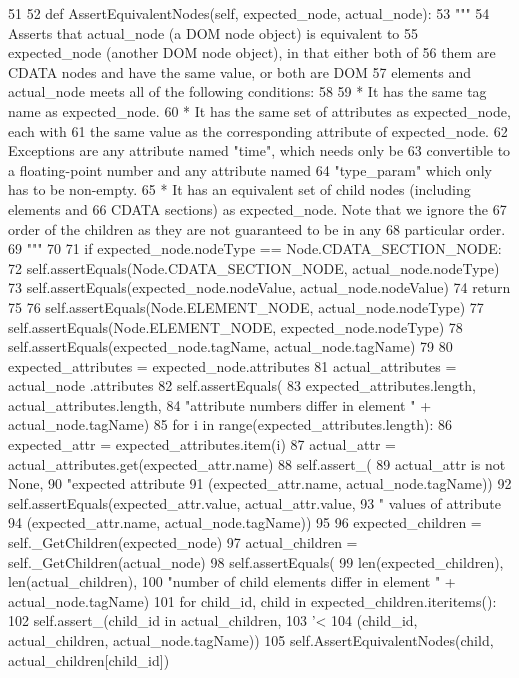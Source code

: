 \begin{DoxyCode}
51 
52   def AssertEquivalentNodes(self, expected_node, actual_node):
53     """
54     Asserts that actual_node (a DOM node object) is equivalent to
55     expected_node (another DOM node object), in that either both of
56     them are CDATA nodes and have the same value, or both are DOM
57     elements and actual_node meets all of the following conditions:
58 
59     *  It has the same tag name as expected_node.
60     *  It has the same set of attributes as expected_node, each with
61        the same value as the corresponding attribute of expected_node.
62        Exceptions are any attribute named "time", which needs only be
63        convertible to a floating-point number and any attribute named
64        "type_param" which only has to be non-empty.
65     *  It has an equivalent set of child nodes (including elements and
66        CDATA sections) as expected_node.  Note that we ignore the
67        order of the children as they are not guaranteed to be in any
68        particular order.
69     """
70 
71     if expected_node.nodeType == Node.CDATA_SECTION_NODE:
72       self.assertEquals(Node.CDATA_SECTION_NODE, actual_node.nodeType)
73       self.assertEquals(expected_node.nodeValue, actual_node.nodeValue)
74       return
75 
76     self.assertEquals(Node.ELEMENT_NODE, actual_node.nodeType)
77     self.assertEquals(Node.ELEMENT_NODE, expected_node.nodeType)
78     self.assertEquals(expected_node.tagName, actual_node.tagName)
79 
80     expected_attributes = expected_node.attributes
81     actual_attributes   = actual_node  .attributes
82     self.assertEquals(
83         expected_attributes.length, actual_attributes.length,
84         "attribute numbers differ in element " + actual_node.tagName)
85     for i in range(expected_attributes.length):
86       expected_attr = expected_attributes.item(i)
87       actual_attr   = actual_attributes.get(expected_attr.name)
88       self.assert_(
89           actual_attr is not None,
90           "expected attribute %
91           (expected_attr.name, actual_node.tagName))
92       self.assertEquals(expected_attr.value, actual_attr.value,
93                         " values of attribute %
94                         (expected_attr.name, actual_node.tagName))
95 
96     expected_children = self._GetChildren(expected_node)
97     actual_children = self._GetChildren(actual_node)
98     self.assertEquals(
99         len(expected_children), len(actual_children),
100         "number of child elements differ in element " + actual_node.tagName)
101     for child_id, child in expected_children.iteritems():
102       self.assert_(child_id in actual_children,
103                    '<%
104                    (child_id, actual_children, actual_node.tagName))
105       self.AssertEquivalentNodes(child, actual_children[child_id])

\end{DoxyCode}
